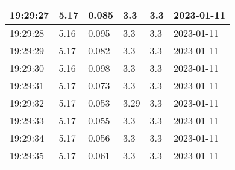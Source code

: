 \begin{longtable}{|l|l|l|l|l|l|}
        19:29:27 & 5.17 & 0.085 & 3.3 & 3.3 & 2023-01-11 \\ \hline
        19:29:28 & 5.16 & 0.095 & 3.3 & 3.3 & 2023-01-11 \\ \hline
        19:29:29 & 5.17 & 0.082 & 3.3 & 3.3 & 2023-01-11 \\ \hline
        19:29:30 & 5.16 & 0.098 & 3.3 & 3.3 & 2023-01-11 \\ \hline
        19:29:31 & 5.17 & 0.073 & 3.3 & 3.3 & 2023-01-11 \\ \hline
        19:29:32 & 5.17 & 0.053 & 3.29 & 3.3 & 2023-01-11 \\ \hline
        19:29:33 & 5.17 & 0.055 & 3.3 & 3.3 & 2023-01-11 \\ \hline
        19:29:34 & 5.17 & 0.056 & 3.3 & 3.3 & 2023-01-11 \\ \hline
        19:29:35 & 5.17 & 0.061 & 3.3 & 3.3 & 2023-01-11 \\ \hline
    \end{longtable}